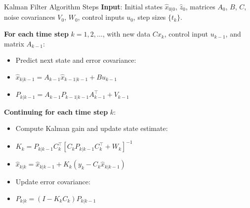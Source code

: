 \documentclass{beamer}
\begin{document}
    \begin{frame}{Kalman Filter Algorithm Steps}
      \textbf{Input}: Initial states $\hat{x}_{0|0}$, $\hat{z}_{0}$, matrices $A_0$, $B$, $C$, noise covariances $V_0$, $W_0$, control inputs $u_0$, step sizes $\{t_k\}$.
  
      \vspace{0.2em} %
    
      \textbf{For each time step} $k = 1, 2, \ldots$, with new data $Cx_k$, control input $u_{k-1}$, and matrix $A_{k-1}$:
      \begin{itemize}
        \item Predict next state and error covariance:
        \item[] $\hat{x}_{k|k-1} = A_{k-1} \hat{x}_{k-1|k-1} + B u_{k-1}$
        \item[] $P_{k|k-1} = A_{k-1} P_{k-1|k-1} A_{k-1}^\top + V_{k-1}$
      \end{itemize}
    
      \vspace{0.2em} %
  
      \textbf{Continuing for each time step} $k$:
      \begin{itemize}
        \item Compute Kalman gain and update state estimate:
        \item[] $K_k = P_{k|k-1} C_k^\top [C_k P_{k|k-1} C_k^\top + W_k]^{-1}$
        \item[] $\hat{x}_{k|k} = \hat{x}_{k|k-1} + K_k (y_k - C_k\hat{x}_{k|k-1})$
      \end{itemize}
    
      \vspace{0.2em} %
    
      \begin{itemize}
        \item Update error covariance:
        \item[] $P_{k|k} = (I - K_k C_k) P_{k|k-1}$
      \end{itemize}
      \end{frame}
\end{document}
